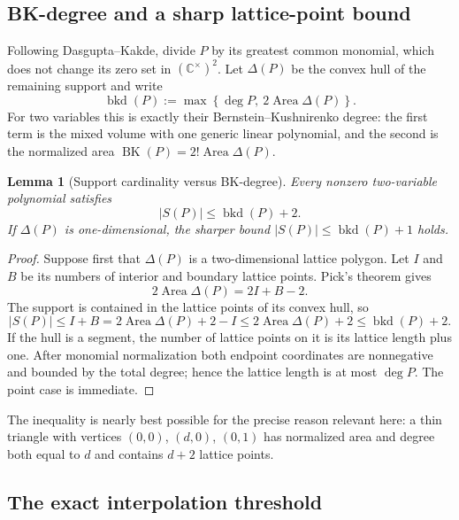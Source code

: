 \documentclass[11pt,oneside]{article}
\newtheorem{lemma}[theorem]{Lemma}
\theoremstyle{definition}
\theoremstyle{remark}
\newcommand{\C}{\mathbb C}
\newcommand{\BK}{\operatorname{BK}}
\begin{document}
\subsection{BK-degree and a sharp lattice-point bound}

Following Dasgupta--Kakde, divide $P$ by its greatest common monomial, which does not change its
zero set in $(\C^\times)^2$.  Let $\Delta(P)$ be the convex hull of the remaining support and
write
\begin{equation}
 \operatorname{bkd}(P)
 :=\max\left\{\deg P,\ 2\operatorname{Area}\Delta(P)\right\}.
 \label{eq:mc-bkd}
\end{equation}
For two variables this is exactly their Bernstein--Kushnirenko degree: the first term is the
mixed volume with one generic linear polynomial, and the second is the normalized area
$\BK(P)=2!\operatorname{Area}\Delta(P)$.

\begin{lemma}[Support cardinality versus BK-degree]
\label{lem:support-bkd}
Every nonzero two-variable polynomial satisfies
\begin{equation}
 |S(P)|\le \operatorname{bkd}(P)+2.
 \label{eq:mc-support-bkd}
\end{equation}
If $\Delta(P)$ is one-dimensional, the sharper bound
$|S(P)|\le\operatorname{bkd}(P)+1$ holds.
\end{lemma}

\begin{proof}
Suppose first that $\Delta(P)$ is a two-dimensional lattice polygon.  Let $I$ and $B$ be its
numbers of interior and boundary lattice points.  Pick's theorem gives
\[
 2\operatorname{Area}\Delta(P)=2I+B-2.
\]
The support is contained in the lattice points of its convex hull, so
\[
 |S(P)|\le I+B
 =2\operatorname{Area}\Delta(P)+2-I
 \le2\operatorname{Area}\Delta(P)+2
 \le\operatorname{bkd}(P)+2.
\]
If the hull is a segment, the number of lattice points on it is its lattice length plus one.
After monomial normalization both endpoint coordinates are nonnegative and bounded by the total
degree; hence the lattice length is at most $\deg P$.  The point case is immediate.
\end{proof}

The inequality is nearly best possible for the precise reason relevant here: a thin triangle
with vertices $(0,0)$, $(d,0)$, $(0,1)$ has normalized area and degree both equal to $d$ and
contains $d+2$ lattice points.

\subsection{The exact interpolation threshold}
\end{document}

